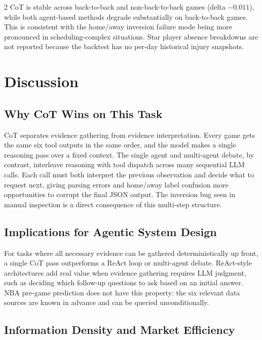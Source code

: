 \documentclass[11pt]{article}
\begin{document}
\begin{multicols}{2}
CoT is stable across back-to-back and non-back-to-back games (delta $-0.011$), while both agent-based methods degrade substantially on back-to-back games. This is consistent with the home/away inversion failure mode being more pronounced in scheduling-complex situations. Star player absence breakdowns are not reported because the backtest has no per-day historical injury snapshots.

\section{Discussion}

\subsection{Why CoT Wins on This Task}

CoT separates evidence gathering from evidence interpretation. Every game gets the same six tool outputs in the same order, and the model makes a single reasoning pass over a fixed context. The single agent and multi-agent debate, by contrast, interleave reasoning with tool dispatch across many sequential LLM calls. Each call must both interpret the previous observation and decide what to request next, giving parsing errors and home/away label confusion more opportunities to corrupt the final JSON output. The inversion bug seen in manual inspection is a direct consequence of this multi-step structure.

\subsection{Implications for Agentic System Design}

For tasks where all necessary evidence can be gathered deterministically up front, a single CoT pass outperforms a ReAct loop or multi-agent debate. ReAct-style architectures add real value when evidence gathering requires LLM judgment, such as deciding which follow-up questions to ask based on an initial answer. NBA pre-game prediction does not have this property: the six relevant data sources are known in advance and can be queried unconditionally.

\subsection{Information Density and Market Efficiency}


\end{multicols}
\end{document}
